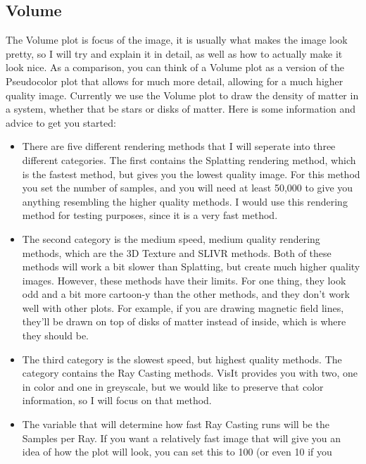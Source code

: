 \documentclass[english]{article}
\begin{document}
    \subsection{Volume}
    The Volume plot is focus of the image, it is usually what makes the image look pretty, so I will try and explain it
    in detail, as well as how to actually make it look nice. As a comparison, you can think of a Volume plot as a version
    of the Pseudocolor plot that allows for much more detail, allowing for a much higher quality image. Currently we use
    the Volume plot to draw the density of matter in a system, whether that be stars or disks of matter. Here is some
    information and advice to get you started:
    \begin{itemize}
        \item There are five different rendering methods that I will seperate into three different categories. The first 
              contains the Splatting rendering method, which is the fastest method, but gives you the lowest quality image.
              For this method you set the number of samples, and you will need at least 50,000 to give you anything 
              resembling the higher quality methods. I would use this rendering method for testing purposes, since it is a
              very fast method. 
        \item The second category is the medium speed, medium quality rendering methods, which are the 3D Texture and SLIVR
              methods. Both of these methods will work a bit slower than Splatting, but create much higher quality images.
              However, these methods have their limits. For one thing, they look odd and a bit more cartoon-y than the other
              methods, and they don't work well with other plots. For example, if you are drawing magnetic field lines,
              they'll be drawn on top of disks of matter instead of inside, which is where they should be.
        \item The third category is the slowest speed, but highest quality methods. The category contains the Ray Casting 
              methods. VisIt provides you with two, one in color and one in greyscale, but we would like to preserve that
              color information, so I will focus on that method.
        \item The variable that will determine how fast Ray Casting runs will be the Samples per Ray. If you want a relatively
              fast image that will give you an idea of how the plot will look, you can set this to 100 (or even 10 if you

\end{itemize}
\end{document}
